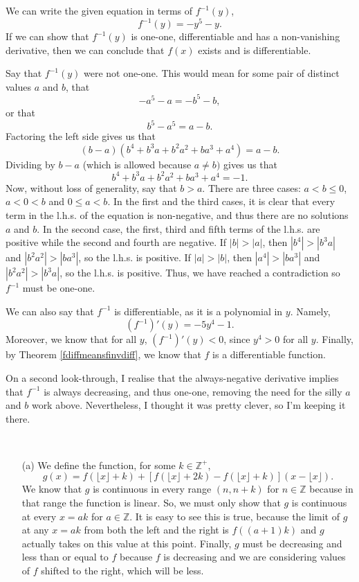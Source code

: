\begin{problem}[12-11]
We can write the given equation in terms of $f^{-1}(y)$,
\[ f^{-1}(y) = -y^5 - y. \]
If we can show that $f^{-1}(y)$ is one-one, differentiable and has a non-vanishing derivative, then we can conclude that $f(x)$ exists and is differentiable. 

Say that $f^{-1}(y)$ were not one-one. This would mean for some pair of distinct values $a$ and $b$, that
\[ -a^5 - a = -b^5 - b, \]
or that
\[ b^5 - a^5 = a - b. \]
Factoring the left side gives us that
\[ (b-a)(b^4 + b^3a + b^2a^2 + ba^3 + a^4) = a-b. \]
Dividing by $b-a$ (which is allowed because $a \ne b)$ gives us that
\[ b^4 + b^3a + b^2a^2 + ba^3 + a^4 = -1. \]
Now, without loss of generality, say that $b > a$. There are three cases: $a < b \le 0$, $a < 0 < b$ and $0 \le a < b$. In the first and the third cases, it is clear that every term in the l.h.s. of the equation is non-negative, and thus there are no solutions $a$ and $b$. In the second case, the first, third and fifth terms of the l.h.s. are positive while the second and fourth are negative. If $|b| > |a|$, then $|b^4| > |b^3a|$ and $|b^2a^2| > |ba^3|$, so the l.h.s. is positive. If $|a| > |b|$, then $|a^4| > |ba^3|$ and $|b^2a^2| > |b^3a|$, so the l.h.s. is positive. Thus, we have reached a contradiction so $f^{-1}$ must be one-one. 

We can also say that $f^{-1}$ is differentiable, as it is a polynomial in $y$. Namely, 
\[ (f^{-1})'(y) = -5y^4 - 1. \]
Moreover, we know that for all $y$, $(f^{-1})'(y) < 0$, since $y^4 > 0$ for all $y$. Finally, by Theorem \ref{fdiffmeansfinvdiff}, we know that $f$ is a differentiable function. 

\begin{remark}
On a second look-through, I realise that the always-negative derivative implies that $f^{-1}$ is always decreasing, and thus one-one, removing the need for the silly $a$ and $b$ work above. Nevertheless, I thought it was pretty clever, so I'm keeping it there.
\end{remark}
\end{problem}

\begin{problem}[12-26] \ 
\begin{itemize}
\item[(a)] We define the function, for some $k \in \mathbb{Z}^+$,
\[ g(x) = f(\lfloor x \rfloor + k) + [f(\lfloor x \rfloor + 2k) - f(\lfloor x \rfloor + k)](x - \lfloor x \rfloor). \]
We know that $g$ is continuous in every range $(n, n + k)$ for $n \in \mathbb{Z}$ because in that range the function is linear. So, we must only show that $g$ is continuous at every $x = ak$ for $a \in \mathbb{Z}$. It is easy to see this is true, because the limit of $g$ at any $x = ak$ from both the left and the right is $f((a+1)k)$ and $g$ actually takes on this value at this point. Finally, $g$ must be decreasing and less than or equal to $f$ because $f$ is decreasing and we are considering values of $f$ shifted to the right, which will be less.
\end{itemize}
\end{problem}

